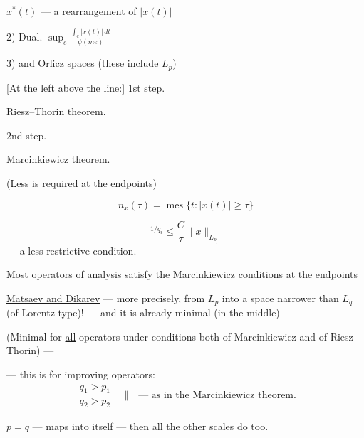 $x^*(t)$ — a rearrangement of $|x (t)|$



2) Dual.\quad
$\displaystyle\sup_e\frac{\int_e|x (t)|\, dt}{\psi (me)}$



3) and Orlicz spaces (these include $L_p$)



[At the left above the line:] 1st step.

Riesz–Thorin theorem.





2nd step.

Marcinkiewicz theorem.

(Less is required at the endpoints)



\begin{equation*}
 n_x (\tau)=\operatorname{mes}\{t:|x (t)|\geq\tau\}
\end{equation*}



\begin{equation*}
 [n_{Ax}(\tau)]^{1/q_i}\leq\frac{C}{\tau}\|x\|_{L_{p_i}}
\end{equation*}
— a less restrictive condition.



Most operators of analysis satisfy the Marcinkiewicz conditions at the endpoints



\underline{Matsaev and Dikarev} — more precisely, from $L_p$ into a space narrower than $L_q$
(of Lorentz type)! — and it is already minimal (in the middle)



(Minimal for \underline{all} operators
under conditions both of Marcinkiewicz and of Riesz–Thorin) —



— this is for improving operators:
\begin{equation*}
\begin{gathered}q_1>p_1\\q_2>p_2\end{gathered}
\quad\Big\Vert\quad\text{— as in the Marcinkiewicz theorem.}
\end{equation*}



$p=q$ — maps into itself — then all the other scales do too.



